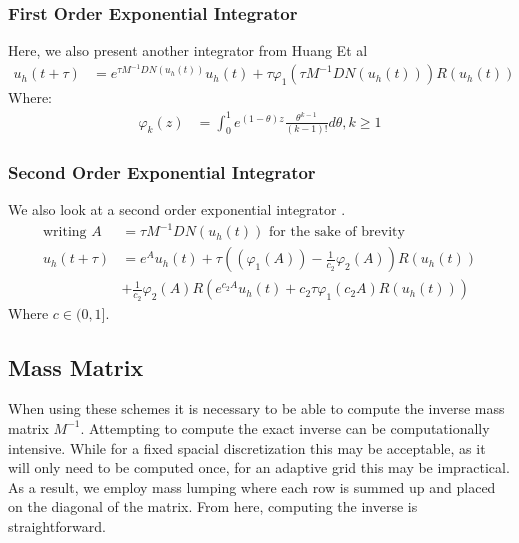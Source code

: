 \subsubsection{First Order Exponential Integrator}
Here, we also present another integrator from Huang Et al \cite{Huang2022}
\begin{align*}
u_h(t+\tau) &= e^{\tau M^{-1} DN(u_h(t))}u_h(t) + \tau \varphi_1(\tau M^{-1} DN(u_h(t)))R(u_h(t))
\end{align*}
Where:
\begin{align*}
    \varphi_k(z) &= \int^1_0e^{(1-\theta)z}\frac{\theta^{k-1}}{(k-1)!}d\theta, k \geq 1
\end{align*}

\subsubsection{Second Order Exponential Integrator}
We also look at a second order exponential integrator \cite{Huang2022}.
\begin{align*}
    \text{writing } A &= \tau M^{-1} DN(u_h(t)) \text{ for the sake of brevity}\\
    u_h(t+\tau) &= e^{A}u_h(t) + \tau((\varphi_1(A)) - \frac 1{c_2}\varphi_2(A))R(u_h(t))\\
    & + \frac1{c_2}\varphi_2(A)R(e^{c_2A}u_h(t) + c_2\tau\varphi_1(c_2 A)R(u_h(t)))
\end{align*}
Where $c \in (0,1]$.

\subsection{Mass Matrix}
When using these schemes it is necessary to be able to compute the inverse mass matrix $M^{-1}$.
Attempting to compute the exact inverse can be computationally intensive. While for a fixed spacial discretization this may be acceptable, as it will only need to be computed once, for an adaptive grid this may be impractical.
As a result, we employ mass lumping where each row is summed up and placed on the diagonal of the matrix.
From here, computing the inverse is straightforward.
